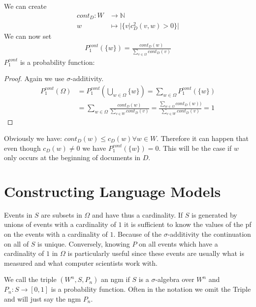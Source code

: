 \documentclass[•]{book}
\begin{document}
\begin{example}
\begin{description}
We can create 
\begin{align}
cont_D:  W & \rightarrow\mathbb{N} \\
w  & \mapsto |\{v| c_D^2(v,w) > 0\}|
\end{align}
We can now set 
\begin{align}
P_1^{cont}(\{w\}) = \frac{cont_D(w)}{\sum_{v\in\Omega}cont_D(v)}
\end{align}
$P_1^{cont}$ is a probability function:
\begin{proof}
Again we use $\sigma$-additivity.
\begin{align}
P_1^{cont}(\Omega) & = P_1^{cont}(\bigcup_{w\in\Omega}\{w\}) = \sum_{w\in\Omega}P_1^{cont}(\{w\} )  \\
& =  \sum_{w\in\Omega} \frac{cont_D(w)}{\sum_{v\in W}cont_D(v)} = \frac{\sum_{w\in \Omega}cont_D(w))}{\sum_{v\in W}cont_D(v)} = 1
\end{align} 
\end{proof}
Obviously we have: $cont_D(w) \leq c_D(w) \forall w\in W$. Therefore it can happen that even though $c_D(w) \neq 0$ we have $P_1^{cont}(\{w\}) = 0$. This will be the case if $w$ only occurs at the beginning of documents in $D$.
\end{description}
\end{example}

\section{Constructing Language Models}

\begin{example}\label{ex:continuation}
Events in $S$ are subsets in $\Omega$ and have thus a cardinality.
If $S$ is generated by unions of events with a cardinality of $1$ it is sufficient to know the values of the \gls{pf} on the events with a cardinality of $1$. Because of the $\sigma$-additivity the continuation on all of $S$ is unique.  
Conversely, knowing $P$ on all events which have a cardinality of $1$ in $\Omega$ is particularly useful since these events are usually what is measured and what computer scientists work with.
\end{example}

\begin{definition}\label{def:ngram-model}We call the triple $(W^{n}, S, P_n)$ an \gls{ngm} if $S$ is a $\sigma$-algebra over $W^{n}$ and $P_n:S\longrightarrow [0,1]$ is a probability function. Often in the notation we omit the Triple and will just say the \gls{ngm} $P_n$. 
\end{definition}
\end{document}
